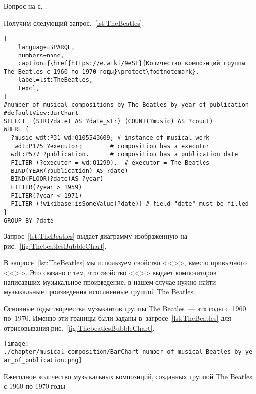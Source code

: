 \begin{task}
    \AnswerBackref Вопрос на с.~\pageref{question:TheBeatles_quest}.
    \label{answer:TheBeatles_answ}

    Получим следующий запрос.~\ref{lst:TheBeatles}.
\begin{lstlisting}[ 
    language=SPARQL, 
    numbers=none,
    caption={\href{https://w.wiki/9eSL}{Количество композиций группы The Beatles с 1960 по 1970 годы}\protect\footnotemark},
    label=lst:TheBeatles,
    texcl,
]
#number of musical compositions by The Beatles by year of publication
#defaultView:BarChart
SELECT  (STR(?date) AS ?date_str) (COUNT(?music) AS ?count)  
WHERE {
  ?music wdt:P31 wd:Q105543609; # instance of musical work
   wdt:P175 ?executor;        # composition has a executor
  wdt:P577 ?publication.      # composition has a publication date
  FILTER (?executor = wd:Q1299).  # executor = The Beatles
  BIND(YEAR(?publication) AS ?date)
  BIND(FLOOR(?date)AS ?year)
  FILTER(?year > 1959)
  FILTER(?year < 1971) 
  FILTER (!wikibase:isSomeValue(?date)) # field "date" must be filled
}
GROUP BY ?date
\end{lstlisting}%

Запрос~\ref{lst:TheBeatles} выдает диаграмму изображенную на рис.~\ref{fig:ThebeatlesBubbleChart}.

В запросе~\ref{lst:TheBeatles} мы используем свойство <<>>, вместо привычного <<>>. Это связано с тем, что свойство <<>> выдает композиторов написавших музыкальное произведение, в нашем случае нужно найти музыкальные произведения исполненные группой The Beatles.

    Основные годы творчества музыкантов группы The Beatles~--- это годы с~1960 по~1970. 
    Именно эти границы были заданы в~запросе~\ref{lst:TheBeatles} 
    для отрисовывания рис.~\ref{fig:ThebeatlesBubbleChart}.

\begin{marginfigure}
	\texttt{[image: ./chapter/musical\_composition/BarChart\_number\_of\_musical\_Beatles\_by\_year\_of\_publication.png]}
	\caption[Гистограмма количества музыкальных композиций The Beatles с 1960 по 1970 годы]
    {Ежегодное количество музыкальных композиций, созданных группой The Beatles с 1960 по 1970 годы}%
 	\label{fig:ThebeatlesBubbleChart}%
\end{marginfigure}
\end{task}
